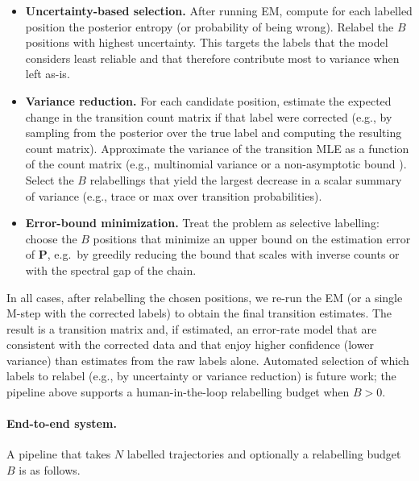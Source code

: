 \begin{itemize}
  \item \textbf{Uncertainty-based selection.} After running EM, compute for each labelled position the posterior entropy (or probability of being wrong). Relabel the $B$ positions with highest uncertainty. This targets the labels that the model considers least reliable and that therefore contribute most to variance when left as-is.
  \item \textbf{Variance reduction.} For each candidate position, estimate the expected change in the transition count matrix if that label were corrected (e.g., by sampling from the posterior over the true label and computing the resulting count matrix). Approximate the variance of the transition MLE as a function of the count matrix (e.g., multinomial variance or a non-asymptotic bound \citep{huang2024nonasymptotic}). Select the $B$ relabellings that yield the largest decrease in a scalar summary of variance (e.g., trace or max over transition probabilities).
  \item \textbf{Error-bound minimization.} Treat the problem as selective labelling: choose the $B$ positions that minimize an upper bound on the estimation error of $\mathbf{P}$, e.g.\ by greedily reducing the bound that scales with inverse counts or with the spectral gap of the chain.
\end{itemize}

In all cases, after relabelling the chosen positions, we re-run the EM (or a single M-step with the corrected labels) to obtain the final transition estimates. The result is a transition matrix and, if estimated, an error-rate model that are consistent with the corrected data and that enjoy higher confidence (lower variance) than estimates from the raw labels alone. Automated selection of which labels to relabel (e.g., by uncertainty or variance reduction) is future work; the pipeline above supports a human-in-the-loop relabelling budget when $B > 0$.

\paragraph{End-to-end system.}
A pipeline that takes $N$ labelled trajectories and optionally a relabelling budget $B$ is as follows.

